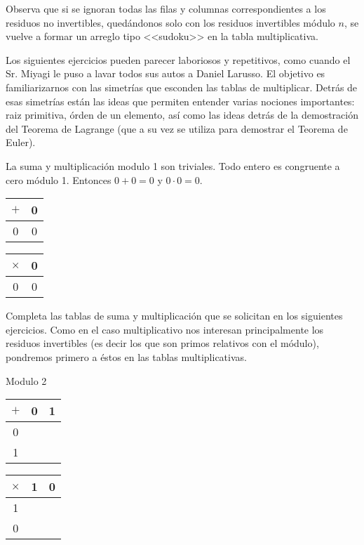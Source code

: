 Observa que si se ignoran todas las filas y columnas correspondientes a los residuos no invertibles, quedándonos solo con los residuos invertibles módulo $n$, se vuelve a formar un arreglo tipo <<sudoku>> en la tabla multiplicativa.

Los siguientes ejercicios pueden parecer laboriosos y repetitivos, como cuando el Sr. Miyagi le puso a lavar todos sus autos a Daniel Larusso. El objetivo es familiarizarnos con las simetrías que esconden las tablas de multiplicar. Detrás de esas simetrías están las ideas que permiten entender varias nociones importantes: raiz primitiva, órden de un elemento, así como las ideas detrás de la demostración del Teorema de Lagrange (que a su vez se utiliza para demostrar el Teorema de Euler).


La suma y multiplicación  modulo 1 son triviales. Todo entero es congruente a cero módulo 1. Entonces $0+0=0$ y $0\cdot 0=0$. 

\begin{tabular}{|c||c|} 
 \hline
  $\plus$ & 0  \\ 
  \hline
  \hline
  0 & 0  \\ 
  \hline
\end{tabular}
\hspace{2cm}
\begin{tabular}{|c||c|} 
 \hline
  $\times$ & 0  \\ 
  \hline
  \hline
  0 & 0  \\ 
  \hline
\end{tabular}    

Completa las tablas de suma y multiplicación que se solicitan en los siguientes ejercicios. Como en el caso multiplicativo nos interesan principalmente los residuos invertibles (es decir los que son primos relativos con el módulo), pondremos primero a éstos en las tablas multiplicativas.

\begin{ejercicio}
 Modulo 2

\begin{tabular}{|c||c|c|} 
 \hline
  $\plus$ & 0 & 1 \\ 
  \hline
  \hline
  0 &  &  \\ 
  \hline
  1 &  &  \\ 
  \hline
\end{tabular}
\hspace{2cm}
\begin{tabular}{|c||c|c|} 
 \hline
  $\times$ & 1 & 0 \\ 
  \hline
  \hline
  1 &  &  \\ 
  \hline
  0 &  &  \\ 
  \hline
\end{tabular}
\end{ejercicio}

